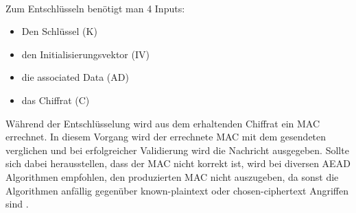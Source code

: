 \\
Zum Entschlüsseln benötigt man 4 Inputs:
\begin{itemize}
\item Den Schlüssel (\gls{K})
\item den Initialisierungsvektor (\gls{IV})
\item die associated Data (\gls{AD})
\item das Chiffrat (\gls{C})
\end{itemize} Während der Entschlüsselung wird aus dem erhaltenden Chiffrat ein MAC errechnet. In diesem Vorgang wird der errechnete MAC mit dem gesendeten verglichen und bei erfolgreicher Validierung wird die Nachricht ausgegeben. Sollte sich dabei herausstellen, dass der MAC nicht korrekt ist, wird bei diversen \gls{AEAD} Algorithmen empfohlen, den produzierten MAC nicht auszugeben, da sonst die Algorithmen anfällig gegenüber known-plaintext oder chosen-ciphertext Angriffen sind \cite{rfc5116}.

